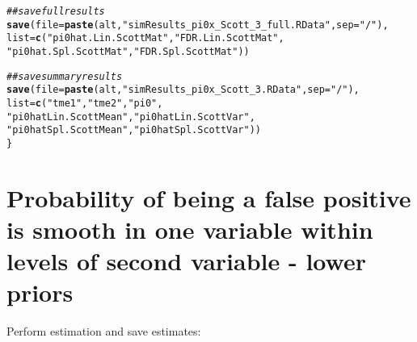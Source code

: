 \documentclass{article}\usepackage[]{graphicx}\usepackage[]{color}
\makeatletter
\newcommand{\hlstr}[1]{\textcolor[rgb]{0.192,0.494,0.8}{#1}}%
\newcommand{\hlcom}[1]{\textcolor[rgb]{0.678,0.584,0.686}{\textit{#1}}}%
\newcommand{\hlstd}[1]{\textcolor[rgb]{0.345,0.345,0.345}{#1}}%
\newcommand{\hlkwc}[1]{\textcolor[rgb]{0.333,0.667,0.333}{#1}}%
\newcommand{\hlkwd}[1]{\textcolor[rgb]{0.737,0.353,0.396}{\textbf{#1}}}%
\newenvironment{kframe}{%
 \def\at@end@of@kframe{}%
 \ifinner\ifhmode%
  \def\at@end@of@kframe{\end{minipage}}%
  \begin{minipage}{\columnwidth}%
 \fi\fi%
 \def\FrameCommand##1{\hskip\@totalleftmargin \hskip-\fboxsep
 \colorbox{shadecolor}{##1}\hskip-\fboxsep
     \hskip-\linewidth \hskip-\@totalleftmargin \hskip\columnwidth}%
 \MakeFramed {\advance\hsize-\width
   \@totalleftmargin\z@ \linewidth\hsize
   \@setminipage}}%
 {\par\unskip\endMakeFramed%
 \at@end@of@kframe}
\newenvironment{knitrout}{}{} %
\makeatother
\begin{document}
\begin{knitrout}
\begin{kframe}
\begin{alltt}
  \hlcom{##save full results}
  \hlkwd{save}\hlstd{(}\hlkwc{file}\hlstd{=}\hlkwd{paste}\hlstd{(alt,}\hlstr{"simResults_pi0x_Scott_3_full.RData"}\hlstd{,}\hlkwc{sep}\hlstd{=}\hlstr{"/"}\hlstd{),}
       \hlkwc{list}\hlstd{=}\hlkwd{c}\hlstd{(}\hlstr{"pi0hat.Lin.ScottMat"}\hlstd{,} \hlstr{"FDR.Lin.ScottMat"}\hlstd{,}
              \hlstr{"pi0hat.Spl.ScottMat"}\hlstd{,} \hlstr{"FDR.Spl.ScottMat"}\hlstd{))}

  \hlcom{##save summary results}
  \hlkwd{save}\hlstd{(}\hlkwc{file}\hlstd{=}\hlkwd{paste}\hlstd{(alt,}\hlstr{"simResults_pi0x_Scott_3.RData"}\hlstd{,}\hlkwc{sep}\hlstd{=}\hlstr{"/"}\hlstd{),}
       \hlkwc{list}\hlstd{=}\hlkwd{c}\hlstd{(}\hlstr{"tme1"}\hlstd{,} \hlstr{"tme2"}\hlstd{,} \hlstr{"pi0"}\hlstd{,}
              \hlstr{"pi0hatLin.ScottMean"}\hlstd{,} \hlstr{"pi0hatLin.ScottVar"}\hlstd{,}
              \hlstr{"pi0hatSpl.ScottMean"}\hlstd{,} \hlstr{"pi0hatSpl.ScottVar"}\hlstd{))}
\hlstd{\}}
\end{alltt}
\end{kframe}
\end{knitrout}

\section{Probability of being a false positive is smooth in one variable within levels of second variable - lower priors}

Perform estimation and save estimates:
\end{document}
